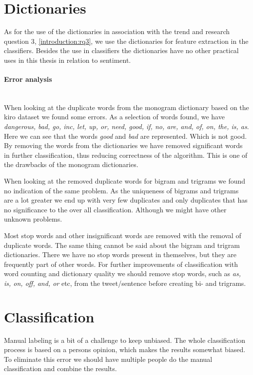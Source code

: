 \section{Dictionaries}\label{results:dictionaries}
As for the use of the dictionaries in association with the trend and research
question 3, \ref{introduction:rq3}, we use the dictionaries for feature
extraction in the classifiers. Besides the use in classifiers the dictionaries
have no other practical uses in this thesis in relation to sentiment.

\paragraph{Error analysis}
\hspace{0pt}\\
When looking at the duplicate words from the monogram dictionary based on the
kiro dataset we found some errors.
As a selection of words found, we have \textit{dangerous, bad, go, inc, let, up,
or, need, good, if, no, are, and, of, on, the,
is, as}.
Here we can see that the words \textit{good} and \textit{bad} are represented.
Which is not good. By removing the words from the dictionaries we have removed
significant words in further classification, thus reducing correctness of the
algorithm. This is one of the drawbacks of the monogram dictionaries.

When looking at the removed duplicate words for bigram and trigrams we found no
indication of the same problem. As the uniqueness of bigrams and trigrams are a
lot greater we end up with very few duplicates and only duplicates that has no
significance to the over all classification. Although we might have other
unknown problems.

Most stop words and other insignificant words are removed with the removal of
duplicate words. The same thing cannot be said about the bigram and trigram
dictionaries. There we have no stop words present in themselves, but they are
frequently part of other words. For further improvements of classification with
word counting and dictionary quality we should remove
stop words, such as \textit{as, is, on, off, and, or} etc, from the
tweet/sentence before creating bi- and trigrams.
%

\section{Classification}\label{results:classification}
Manual labeling is a bit of a challenge to keep unbiased. The whole
classification process is based on a persons opinion, which makes the results
somewhat biased. To eliminate this error we should have multiple people do the
manual classification and combine the results.  

